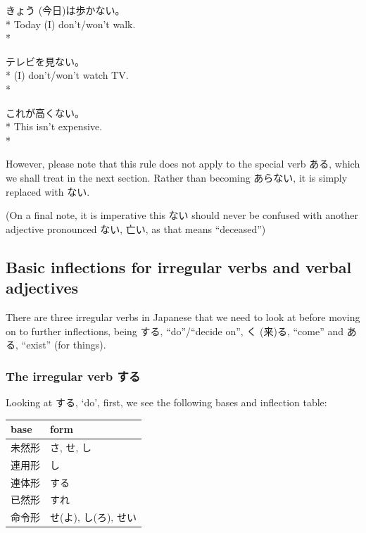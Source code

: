 \documentclass[11pt, b5paper, twoside, openright, onecolumn]{book}
\makeatletter
\newcommand*{\rubystack}[2]{{\relscale{0.5}%
  \begin{tabular}[b]{@{}c@{}}%
    {#1}\\%
   {\textscale{2}{#2}}%
  \end{tabular}}%
}
\DeclareRobustCommand*{\ruby}[2]{%
  \mbox{%
    \setlength{\parskip}{0ex}%
    \BeginAccSupp{method=pdfstringdef,ActualText={#1}}%
      \rubystack{\phantom{#2}}{#1}%
      \llap{%
        \rubystack{#2}{\phantom{#1}}%
      }%
    \EndAccSupp{}%
  }%
}
\renewcommand*{\ruby}[2]{#2 (#1)}%
\newenvironment{exampleblock}{
\setlength{\parindent}{0.6in}
\begin{minipage}[t]{\dimexpr\textwidth-\parindent}}
{\end{minipage}}
\newenvironment{mytabular}[1]{\noindent\hspace{0.4in}
\begin{tabular}[h]{#1}}{\end{tabular}}
\makeatother
\begin{document}
\vspace{0.4cm}
\begin{exampleblock}
\ruby{今日}{きょう}は歩かない。 \\* 
Today (I) don’t/won’t walk. \\* 
\end{exampleblock}
\vspace{0.2cm}

\begin{exampleblock}
テレビを見ない。 \\* 
(I) don’t/won’t watch TV. \\* 
\end{exampleblock}
\vspace{0.2cm}

\begin{exampleblock}
これが高くない。 \\* 
This isn’t expensive. \\* 
\end{exampleblock}
\vspace{0.2cm}

However‚ please note that this rule does not apply to the special verb ある‚ which we shall treat in the next section. Rather than becoming あらない‚ it is simply replaced with ない.

(On a final note‚ it is imperative this ない should never be confused with another adjective pronounced ない‚ 亡い‚ as that means “deceased”)

\subsection{Basic inflections for irregular verbs and verbal adjectives}

There are three irregular verbs in Japanese that we need to look at before moving on to further inflections‚ being する‚ “do”/“decide on”‚ \ruby{来}{く}る‚ “come” and ある‚ “exist” (for  things).

\subsubsection{The irregular verb する}

Looking at する‚ ‘do’‚ first‚ we see the following bases and inflection table:

\vspace{0.5cm}
\smaller
\begin{mytabular}{| l  l |}\hline 
\rule{0pt}{2.4ex}base & form\\ 
\hline
\rule{0pt}{2.4ex}未然形 & さ‚ せ‚ し\\ 
\rule{0pt}{2.4ex}連用形 & し\\ 
\rule{0pt}{2.4ex}連体形 & する\\ 
\rule{0pt}{2.4ex}已然形 & すれ\\ 
\rule{0pt}{2.4ex}命令形 & せ(よ)‚ し(ろ)‚ せい\\ 
\hline 
\end{mytabular}
\larger
\vspace{0.5cm}
\end{document}
